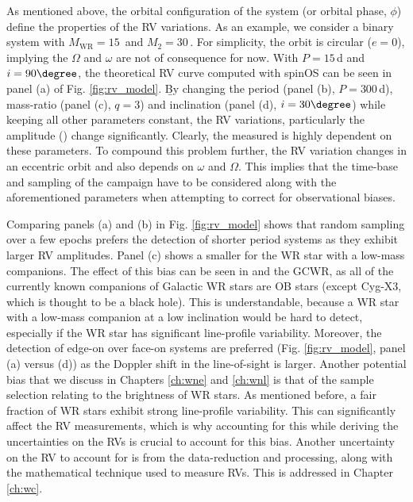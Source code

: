 As mentioned above, the orbital configuration of the system (or orbital phase, $\phi$) define the properties of the RV variations. As an example, we consider a binary system with $M_{\textrm{WR}} = 15\,$\Msun{} and $M_2 = 30\,$\Msun{}. For simplicity, the orbit is circular ($e=0$), implying the $\Omega$ and $\omega$ are not of consequence for now. With $P=15\,$d and $i=90\degree$, the theoretical RV curve computed with spinOS \citep{2021Fabry} can be seen in panel (a) of Fig. \ref{fig:rv_model}. \b{By changing the period (panel (b), $P=300\,$d), mass-ratio (panel (c), $q=3$) and inclination (panel (d), $i=30\degree$) while keeping all other parameters constant, the RV variations, particularly the amplitude (\DelRV{}) change significantly.} Clearly, the measured \DelRV{} is highly dependent on these parameters. To compound this problem further, the RV variation changes in an eccentric orbit and also depends on $\omega$ and $\Omega$. This implies that the time-base and sampling of the campaign have to be considered along with the aforementioned parameters when attempting to correct for observational biases.

Comparing panels (a) and (b) in Fig. \ref{fig:rv_model} shows that random sampling over a few epochs prefers the detection of shorter period systems as they exhibit larger RV amplitudes. Panel (c) shows a smaller \DelRV{} for the WR star with a low-mass companions. The effect of this bias can be seen in  and the GCWR, as all of the currently known companions of Galactic WR stars are OB stars (except Cyg-X3, which is thought to be a black hole). This is understandable, because a WR star with a low-mass companion at a low inclination would be hard to detect, especially if the WR star has significant line-profile variability. Moreover, the detection of edge-on over face-on systems are preferred (Fig. \ref{fig:rv_model}, panel (a) versus (d)) as the Doppler shift in the line-of-sight is larger. Another potential bias that we discuss in Chapters \ref{ch:wne} and \ref{ch:wnl} is that of the sample selection relating to the brightness of WR stars. As mentioned before, a fair fraction of WR stars exhibit strong line-profile variability. This can significantly affect the RV measurements, which is why accounting for this while deriving the uncertainties on the RVs is crucial to account for this bias. Another uncertainty on the RV to account for is from the data-reduction and processing, along with the mathematical technique used to measure RVs. This is addressed in Chapter \ref{ch:wc}.

